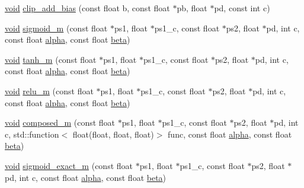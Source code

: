 \begin{DoxyCompactItemize}
\mbox{\hyperlink{mlasi_8h_a88f941d423cb2a819b70a1358982b1a6}{void}} \mbox{\hyperlink{namespaceonnxruntime_1_1rnn_1_1detail_1_1deepcpu_acd60c3700240c698443b8d45bf6a4e65}{clip\+\_\+add\+\_\+bias}} (const float b, const float $\ast$pb, float $\ast$pd, const int c)
\item 
\mbox{\hyperlink{mlasi_8h_a88f941d423cb2a819b70a1358982b1a6}{void}} \mbox{\hyperlink{namespaceonnxruntime_1_1rnn_1_1detail_1_1deepcpu_a1f8aaad863b8c54e1da63bc6e8973a59}{sigmoid\+\_\+m}} (const float $\ast$ps1, float $\ast$ps1\+\_\+c, const float $\ast$ps2, float $\ast$pd, int c, const float \mbox{\hyperlink{mlasi_8h_a1763355f32e1812e5cb3a0080e7cca12}{alpha}}, const float \mbox{\hyperlink{mlasi_8h_a5fd37d216981b4cd9a19e29b5acd48d4}{beta}})
\item 
\mbox{\hyperlink{mlasi_8h_a88f941d423cb2a819b70a1358982b1a6}{void}} \mbox{\hyperlink{namespaceonnxruntime_1_1rnn_1_1detail_1_1deepcpu_aae689eb766818fc1c1da8aa2bc923b31}{tanh\+\_\+m}} (const float $\ast$ps1, float $\ast$ps1\+\_\+c, const float $\ast$ps2, float $\ast$pd, int c, const float \mbox{\hyperlink{mlasi_8h_a1763355f32e1812e5cb3a0080e7cca12}{alpha}}, const float \mbox{\hyperlink{mlasi_8h_a5fd37d216981b4cd9a19e29b5acd48d4}{beta}})
\item 
\mbox{\hyperlink{mlasi_8h_a88f941d423cb2a819b70a1358982b1a6}{void}} \mbox{\hyperlink{namespaceonnxruntime_1_1rnn_1_1detail_1_1deepcpu_afdd30b5fdc3181eeac5fe57327468438}{relu\+\_\+m}} (const float $\ast$ps1, float $\ast$ps1\+\_\+c, const float $\ast$ps2, float $\ast$pd, int c, const float \mbox{\hyperlink{mlasi_8h_a1763355f32e1812e5cb3a0080e7cca12}{alpha}}, const float \mbox{\hyperlink{mlasi_8h_a5fd37d216981b4cd9a19e29b5acd48d4}{beta}})
\item 
\mbox{\hyperlink{mlasi_8h_a88f941d423cb2a819b70a1358982b1a6}{void}} \mbox{\hyperlink{namespaceonnxruntime_1_1rnn_1_1detail_1_1deepcpu_a78584ae89a0559ff0001b4ffc3d0dcb7}{composed\+\_\+m}} (const float $\ast$ps1, float $\ast$ps1\+\_\+c, const float $\ast$ps2, float $\ast$pd, int c, std\+::function$<$ float(float, float, float)$>$ func, const float \mbox{\hyperlink{mlasi_8h_a1763355f32e1812e5cb3a0080e7cca12}{alpha}}, const float \mbox{\hyperlink{mlasi_8h_a5fd37d216981b4cd9a19e29b5acd48d4}{beta}})
\item 
\mbox{\hyperlink{mlasi_8h_a88f941d423cb2a819b70a1358982b1a6}{void}} \mbox{\hyperlink{namespaceonnxruntime_1_1rnn_1_1detail_1_1deepcpu_a6f774e13fe051815ea772646cbf8c1e4}{sigmoid\+\_\+exact\+\_\+m}} (const float $\ast$ps1, float $\ast$ps1\+\_\+c, const float $\ast$ps2, float $\ast$pd, int c, const float \mbox{\hyperlink{mlasi_8h_a1763355f32e1812e5cb3a0080e7cca12}{alpha}}, const float \mbox{\hyperlink{mlasi_8h_a5fd37d216981b4cd9a19e29b5acd48d4}{beta}})

\end{DoxyCompactItemize}
